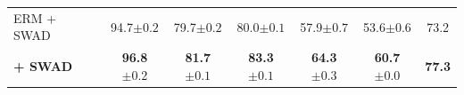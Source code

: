 \begin{table}
\begin{tabular}{l|ccccc|c}
\midrule
ERM + SWAD      & 94.7\scriptsize{$\pm0.2$}  &  79.7\scriptsize{$\pm0.2$}  &  80.0\scriptsize{$\pm0.1$}  &  57.9\scriptsize{$\pm0.7$}  &  53.6\scriptsize{$\pm0.6$}  &  73.2  \\
\textbf{\method{} + SWAD}  & \textbf{96.8\scriptsize{$\pm0.2$}}  &  \textbf{81.7\scriptsize{$\pm0.1$}}  &  \textbf{83.3\scriptsize{$\pm0.1$}}  &  \textbf{64.3\scriptsize{$\pm0.3$}}  &  \textbf{60.7\scriptsize{$\pm0.0$}}  &  \textbf{77.3}  \\
\bottomrule
\end{tabular}
\end{table}